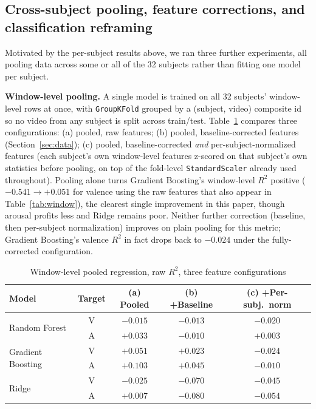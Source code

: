\documentclass[conference]{IEEEtran}
\begin{document}
\FloatBarrier

\subsection{Cross-subject pooling, feature corrections, and classification reframing}
\label{subsec:results-pooled}

Motivated by the per-subject results above, we ran three further
experiments, all pooling data across some or all of the 32 subjects
rather than fitting one model per subject.

\textbf{Window-level pooling.} A single model is trained on all 32
subjects' window-level rows at once, with \texttt{GroupKFold} grouped by
a (subject, video) composite id so no video from any subject is split
across train/test. Table~\ref{tab:pooled} compares three configurations:
(a) pooled, raw features; (b) pooled, baseline-corrected features
(Section~\ref{sec:data}); (c) pooled, baseline-corrected \emph{and}
per-subject-normalized features (each subject's own window-level features
z-scored on that subject's own statistics before pooling, on top of the
fold-level \texttt{StandardScaler} already used throughout). Pooling
alone turns Gradient Boosting's window-level $R^2$ positive
($-0.541\rightarrow+0.051$ for valence using the raw features that also
appear in Table~\ref{tab:window}), the clearest single improvement in
this paper, though arousal profits less and Ridge remains poor. Neither
further correction (baseline, then per-subject normalization) improves on
plain pooling for this metric; Gradient Boosting's valence $R^2$ in fact
drops back to $-0.024$ under the fully-corrected configuration.

\begin{table}[!t]
\centering
\caption{Window-level pooled regression, raw $R^2$, three feature configurations}
\label{tab:pooled}
\small
\begin{tabular}{lcccc}
\toprule
Model & Target & (a) Pooled & (b) +Baseline & (c) +Per-subj.\ norm \\
\midrule
\multirow{2}{*}{Random Forest}    & V & $-0.015$ & $-0.013$ & $-0.020$ \\
                                   & A & $+0.033$ & $-0.010$ & $+0.003$ \\
\multirow{2}{*}{Gradient Boosting} & V & $+0.051$ & $+0.023$ & $-0.024$ \\
                                   & A & $+0.103$ & $+0.045$ & $-0.010$ \\
\multirow{2}{*}{Ridge}             & V & $-0.025$ & $-0.070$ & $-0.045$ \\
                                   & A & $+0.007$ & $-0.080$ & $-0.054$ \\
\bottomrule
\end{tabular}
\end{table}
\end{document}
